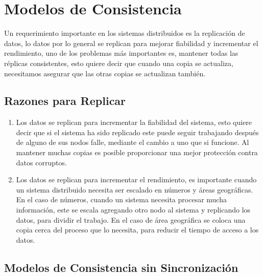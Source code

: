 
\chapter{Modelos de Consistencia} %

\label{ch:modelos_consistencia} %

Un requerimiento importante en los sistemas distribuidos es la replicación de datos, lo datos por lo general se replican para mejorar fiabilidad y incrementar el rendimiento, uno de los problemas más importantes es, mantener todas las réplicas consistentes, esto quiere decir que cuando una copia se actualiza, necesitamos asegurar que las otras copias se actualizan también.  


\section{Razones para Replicar}

\begin{enumerate}
\item Los datos se replican para incrementar la fiabilidad del sistema, esto quiere decir que si el sistema ha sido replicado este puede seguir trabajando después de alguno de sus nodos falle, mediante el cambio a uno que si funcione. Al mantener muchas copias es posible proporcionar una mejor protección contra datos corruptos. 
\item Los datos se replican para incrementar el rendimiento, es importante cuando un sistema distribuido necesita ser escalado en números y áreas geográficas. En el caso de números, cuando un sistema necesita procesar mucha información, este se escala agregando otro nodo al sistema y replicando los datos, para dividir el trabajo. En el caso de área geográfica se coloca una copia cerca del proceso que lo necesita, para reducir el tiempo de acceso a los datos.

\end{enumerate}


\section{Modelos de Consistencia sin Sincronización}

